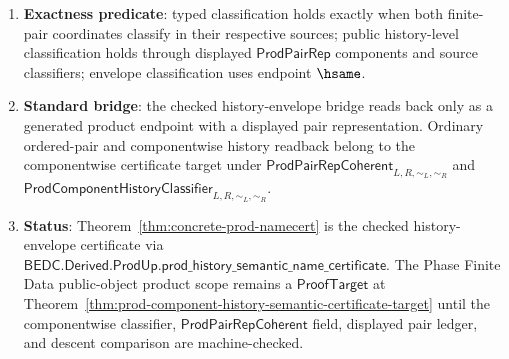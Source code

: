 \begin{enumerate}
  \item \textbf{Exactness predicate}: typed classification holds exactly when both finite-pair coordinates classify in their respective sources; public history-level classification holds through displayed $\mathsf{ProdPairRep}$ components and source classifiers; envelope classification uses endpoint $\hsame$.
  \item \textbf{Standard bridge}: the checked history-envelope bridge reads back only as a generated product endpoint with a displayed pair representation. Ordinary ordered-pair and componentwise history readback belong to the componentwise certificate target under $\mathsf{ProdPairRepCoherent}_{L,R,\sim_L,\sim_R}$ and $\mathsf{ProdComponentHistoryClassifier}_{L,R,\sim_L,\sim_R}$.
  \item \textbf{Status}: Theorem~\ref{thm:concrete-prod-namecert} is the checked history-envelope certificate via $\mathsf{BEDC.Derived.ProdUp.prod\_history\_semantic\_name\_certificate}$. The Phase Finite Data public-object product scope remains a $\mathsf{ProofTarget}$ at Theorem~\ref{thm:prod-component-history-semantic-certificate-target} until the componentwise classifier, $\mathsf{ProdPairRepCoherent}$ field, displayed pair ledger, and descent comparison are machine-checked.
\end{enumerate}

